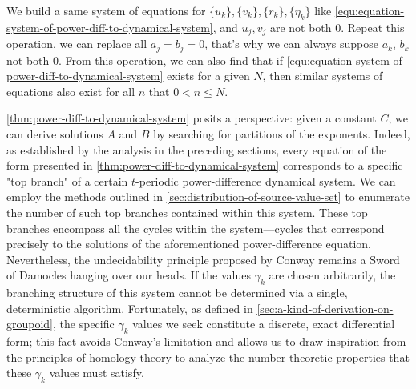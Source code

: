 We build a same system of equations for $\{u_k\}, \{v_k\}, \{r_k\}, \{\eta_k\}$ like \cref{equ:equation-system-of-power-diff-to-dynamical-system}, and $u_j, v_j$ are not both $0$. Repeat this operation, we can replace all $a_{j} = b_{j} = 0$, that's why we can always suppose $a_k$, $b_k$ not both $0$. From this operation, we can also find that if \cref{equ:equation-system-of-power-diff-to-dynamical-system} exists for a given $N$, then similar systems of equations also exist for all $n$ that $0 < n \le N$.

\cref{thm:power-diff-to-dynamical-system} posits a perspective: given a constant $C$, we can derive solutions $A$ and $B$ by searching for partitions of the exponents.
Indeed, as established by the analysis in the preceding sections, every equation of the form presented in \cref{thm:power-diff-to-dynamical-system} corresponds to a specific "top branch" of a certain $t$-periodic power-difference dynamical system.
We can employ the methods outlined in \cref{sec:distribution-of-source-value-set} to enumerate the number of such top branches contained within this system.
These top branches encompass all the cycles within the system—cycles that correspond precisely to the solutions of the aforementioned power-difference equation. Nevertheless, the undecidability principle proposed by Conway remains a Sword of Damocles hanging over our heads. If the values $\gamma_k$ are chosen arbitrarily, the branching structure of this system cannot be determined via a single, deterministic algorithm. Fortunately, as defined in \cref{sec:a-kind-of-derivation-on-groupoid}, the specific $\gamma_k$ values we seek constitute a discrete, exact differential form; this fact avoids Conway's limitation and allows us to draw inspiration from the principles of homology theory to analyze the number-theoretic properties that these $\gamma_k$ values must satisfy.

